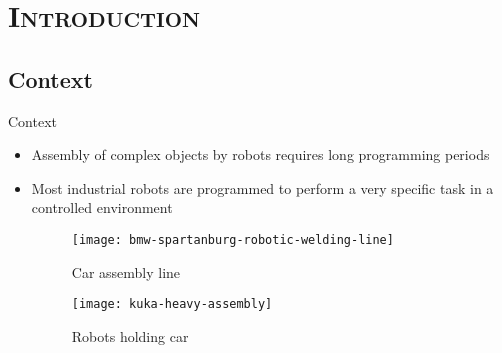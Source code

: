 \section{\scshape Introduction}\label{sec:introduction}

\subsection{Context}
\begin{frame}{Context}
	\begin{itemize}
		\item Assembly of complex objects by robots requires long programming periods
		\item Most industrial robots are programmed to perform a very specific task in a controlled environment
		\begin{figure}[!ht]
			\centering
			\begin{minipage}{.35\textwidth}
				\centering
				\texttt{[image: bmw-spartanburg-robotic-welding-line]}
				\caption{Car assembly line}
			\end{minipage}%
			\begin{minipage}{0.60\textwidth}
				\centering
				\texttt{[image: kuka-heavy-assembly]}
				\caption{Robots holding car}
			\end{minipage}
		\end{figure}
	\end{itemize}
\end{frame}


